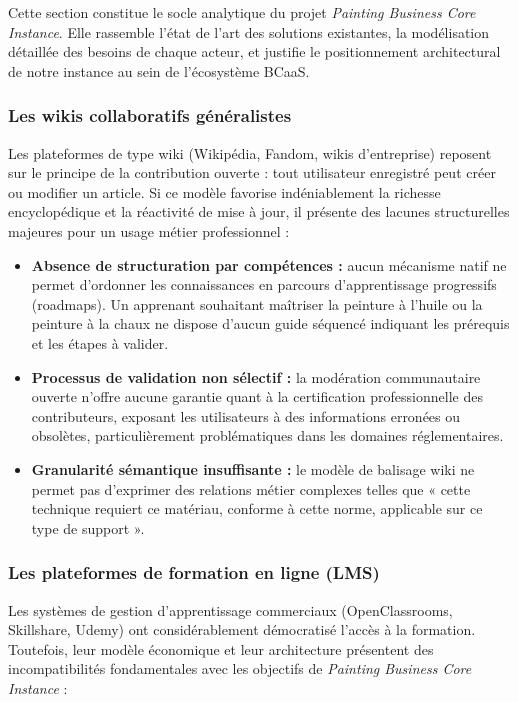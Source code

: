 \documentclass[12pt,a4paper]{report}
\begin{document}
Cette section constitue le socle analytique du projet \textit{Painting Business Core Instance}. Elle rassemble l'état de l'art des solutions existantes, la modélisation détaillée des besoins de chaque acteur, et justifie le positionnement architectural de notre instance au sein de l'écosystème BCaaS.

\subsubsection*{Les wikis collaboratifs généralistes}

\noindent
Les plateformes de type wiki (Wikipédia, Fandom, wikis d'entreprise) reposent sur le principe de la contribution ouverte : tout utilisateur enregistré peut créer ou modifier un article. Si ce modèle favorise indéniablement la richesse encyclopédique et la réactivité de mise à jour, il présente des lacunes structurelles majeures pour un usage métier professionnel :

\begin{itemize}[leftmargin=1.5cm, itemsep=4pt]
    \item \textbf{Absence de structuration par compétences :} aucun mécanisme natif ne permet d'ordonner les connaissances en parcours d'apprentissage progressifs (roadmaps). Un apprenant souhaitant maîtriser la peinture à l'huile ou la peinture à la chaux ne dispose d'aucun guide séquencé indiquant les prérequis et les étapes à valider.
    \item \textbf{Processus de validation non sélectif :} la modération communautaire ouverte n'offre aucune garantie quant à la certification professionnelle des contributeurs, exposant les utilisateurs à des informations erronées ou obsolètes, particulièrement problématiques dans les domaines réglementaires.
    \item \textbf{Granularité sémantique insuffisante :} le modèle de balisage wiki ne permet pas d'exprimer des relations métier complexes telles que « cette technique requiert ce matériau, conforme à cette norme, applicable sur ce type de support ».
\end{itemize}

\subsubsection*{Les plateformes de formation en ligne (LMS)}

\noindent
Les systèmes de gestion d'apprentissage commerciaux (OpenClassrooms, Skillshare, Udemy) ont considérablement démocratisé l'accès à la formation. Toutefois, leur modèle économique et leur architecture présentent des incompatibilités fondamentales avec les objectifs de \textit{Painting Business Core Instance} :
\end{document}
